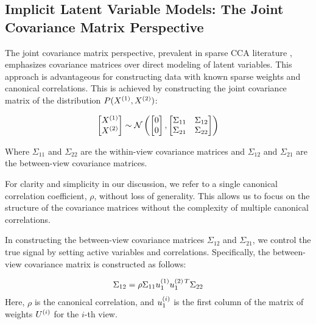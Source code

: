 \subsection{Implicit Latent Variable Models: The Joint Covariance Matrix Perspective}

The joint covariance matrix perspective, prevalent in sparse CCA literature \citep{suo2017sparse,chen2013sparse}, emphasizes covariance matrices over direct modeling of latent variables.
This approach is advantageous for constructing data with known sparse weights and canonical correlations.
This is achieved by constructing the joint covariance matrix of the distribution \(P(X^{(1)},X^{(2)})\):

\begin{align}
    \begin{bmatrix}
        X^{(1)} \\ X^{(2)}
    \end{bmatrix} \sim \mathcal{N} \left( \begin{bmatrix}
                                              0 \\ 0
    \end{bmatrix}, \begin{bmatrix}
                       \Sigma_{11} & \Sigma_{12} \\ \Sigma_{21} & \Sigma_{22}
    \end{bmatrix} \right)
\end{align}

Where \(\Sigma_{11}\) and \(\Sigma_{22}\) are the within-view covariance matrices and \(\Sigma_{12}\) and \(\Sigma_{21}\) are the between-view covariance matrices.

For clarity and simplicity in our discussion, we refer to a single canonical correlation coefficient, \(\rho\), without loss of generality.
This allows us to focus on the structure of the covariance matrices without the complexity of multiple canonical correlations.

In constructing the between-view covariance matrices \(\Sigma_{12}\) and \(\Sigma_{21}\), we control the true signal by setting active variables and correlations.
Specifically, the between-view covariance matrix is constructed as follows:

\begin{align}
    \Sigma_{12} = \rho \Sigma_{11} u^{(1)}_{1} u^{(2)\,T}_{1} \Sigma_{22}
\end{align}
%
Here, \(\rho\) is the canonical correlation, and \(u^{(i)}_{1}\) is the first column of the matrix of weights \(U^{(i)}\) for the \(i\)-th view.

